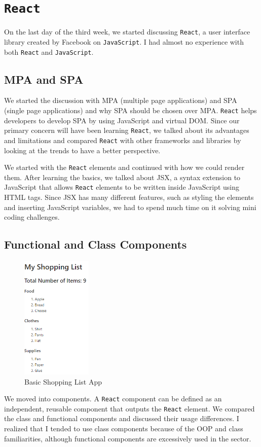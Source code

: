 \section{\texttt{React}}

On the last day of the third week, we started discussing \texttt{React}, a user interface library created by Facebook on \texttt{JavaScript}. I had almost no experience with both \texttt{React} and \texttt{JavaScript}. 

\subsection{MPA and SPA}

We started the discussion with MPA (multiple page applications) and SPA (single page applications) and why SPA should be chosen over MPA. \texttt{React} helps developers to develop SPA by using JavaScript and virtual DOM. Since our primary concern will have been learning \texttt{React}, we talked about its advantages and limitations and compared \texttt{React} with other frameworks and libraries by looking at the trends to have a better perspective.

We started with the \texttt{React} elements and continued with how we could render them. After learning the basics, we talked about JSX, a syntax extension to JavaScript that allows \texttt{React} elements to be written inside JavaScript using HTML tags. Since JSX has many different features, such as styling the elements and inserting JavaScript variables, we had to spend much time on it solving mini coding challenges.

\subsection{Functional and Class Components}

\begin{figure}
  \centering
  \includegraphics[width=0.3\textwidth]{img/shopping-app.png}
  \caption{Basic Shopping List App}
\end{figure}
We moved into components. A \texttt{React} component can be defined as an independent, reusable component that outputs the \texttt{React} element. We compared the class and functional components and discussed their usage differences. I realized that I tended to use class components because of the OOP and class familiarities, although functional components are excessively used in the sector.

